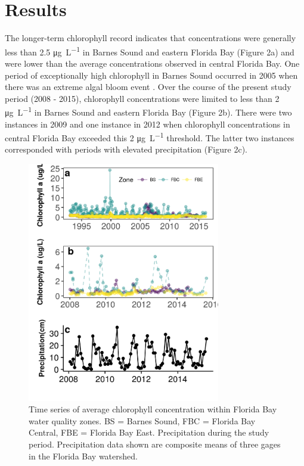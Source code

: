 \section{Results}
\label{results}

The longer-term chlorophyll record indicates that concentrations were generally less than 2.5 \si{\micro\gram\per\liter} in Barnes Sound and eastern Florida Bay (Figure 2a) and were lower than the average concentrations observed in central Florida Bay. One period of exceptionally high chlorophyll in Barnes Sound occurred in 2005 when there was an extreme algal bloom event \citep{rudnick_2006}. Over the course of the present study period (2008 - 2015), chlorophyll concentrations were limited to less than 2 \si{\micro\gram\per\liter} in Barnes Sound and eastern Florida Bay (Figure 2b). There were two instances in 2009 and one instance in 2012 when chlorophyll concentrations in central Florida Bay exceeded this 2 \si{\micro\gram\per\liter} threshold. The latter two instances corresponded with periods with elevated precipitation (Figure 2c).

\begin{figure}
  \centering
  \includegraphics[width=0.75\textwidth]{../../figures/chltimeseries.png}
  \caption{Time series of average chlorophyll concentration within Florida Bay water quality zones. BS = Barnes Sound, FBC = Florida Bay Central, FBE = Florida Bay East. Precipitation during the study period. Precipitation data shown are composite means of three gages in the Florida Bay watershed.}
  \label{fig:2}
\end{figure}

